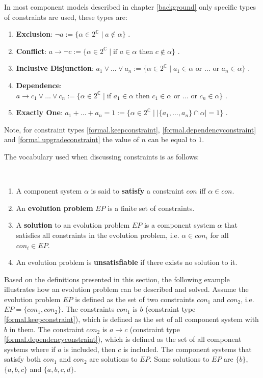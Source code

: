 In most component models described in chapter \ref{background} only specific types of constraints are used, these types are:
\begin{enumerate}
  \label{formal.constrainttypes}
  \item \textbf{Exclusion}: $\neg a := \{\alpha \in 2^{\mathbb{C}} \mid a \not \in \alpha \}$ \label{formal.removeconstraint}.
  \item \textbf{Conflict}: $a \rightarrow \neg c := \{\alpha \in 2^{\mathbb{C}} \mid \mbox{if } a \in \alpha \mbox{ then } c \not \in \alpha\}$ \label{formal.conflictconstraint}.
  \item \textbf{Inclusive Disjunction}: $a_1 \vee \ldots \vee a_n := \{\alpha \in 2^{\mathbb{C}} \mid a_1 \in \alpha \mbox{ or }\ldots \mbox{ or } a_n \in \alpha\}$ \label{formal.keepconstraint}.
  \item \textbf{Dependence}: $a \rightarrow c_1 \vee \ldots \vee c_n := \{\alpha \in 2^{\mathbb{C}} \mid \mbox{if } a_1 \in \alpha \mbox{ then }  c_1 \in \alpha \mbox{ or } \ldots \mbox{ or } c_n \in \alpha\}$ \label{formal.dependencyconstraint}.
  \item \textbf{Exactly One}: $a_1 + \ldots + a_n = 1 := \{\alpha \in 2^{\mathbb{C}} \mid |\{a_1,\ldots,a_n\} \cap \alpha| = 1\}$ \label{formal.upgradeconstraint}.
\end{enumerate}
Note, for constraint types \ref{formal.keepconstraint}, \ref{formal.dependencyconstraint} and \ref{formal.upgradeconstraint} the value of $n$ can be equal to $1$.

The vocabulary used when discussing constraints is as follows:
\begin{defs}
\label{formal.constraintdefs}
{\ }
\begin{enumerate}
  \item A component system $\alpha$ is said to \textbf{satisfy} a constraint $con$ iff $\alpha \in con$.
  \item An \textbf{evolution problem} $EP$ is a finite set of constraints.
  \item A \textbf{solution} to an evolution problem $EP$ is a component system  $\alpha$  that satisfies all constraints in the evolution problem, i.e. $\alpha \in con_i$ for all $con_i \in EP$.
  \item An evolution problem is \textbf{unsatisfiable} if there exists no solution to it.  
\end{enumerate}
\end{defs}

Based on the definitions presented in this section, the following example illustrates how an evolution problem can be described and solved.
Assume the evolution problem $EP$ is defined as the set of two constraints $con_1$ and $con_2$, i.e. $EP = \{con_1,con_2\}$.
The constraints $con_1$ is $b$ (constraint type \ref{formal.keepconstraint}), which is defined as the set of all component system with $b$ in them.
The constraint $con_2$ is $a \rightarrow c$ (constraint type \ref{formal.dependencyconstraint}), which is defined as the set of all component systems where if $a$ is included, then $c$ is included.
The component systems that satisfy both $con_1$ and $con_2$ are solutions to $EP$.
Some solutions to $EP$ are $\{b\}$, $\{a,b,c\}$ and $\{a,b,c,d\}$.

